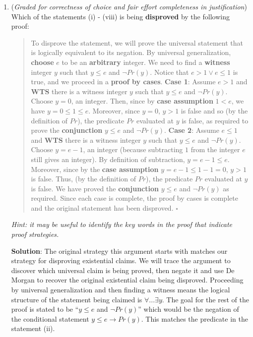 \begin{enumerate}
\begin{enumerate}
   \item ({\it Graded for correctness of choice and fair effort completeness in justification}) 
   Which of the statements (i) - (viii) is being {\bf disproved} by the following proof:
   \begin{quote}
     To disprove the statement, we will prove the universal
     statement that is logically equivalent to its negation. 
     By universal generalization, {\bf choose} $e$ to be an {\bf arbitrary} integer. 
     We need to find a {\bf witness} integer $y$ such that $y \leq e$ and $\lnot Pr(y)$.
     Notice that $e > 1 \lor e \leq 1$ is true, and we proceed in a {\bf proof by cases}.
     {\bf Case 1}: Assume $e > 1$ and {\bf WTS} there is a witness integer $y$ such that
     $y \leq e$ and $\lnot Pr(y)$. Choose $y = 0$, an integer. Then, since by {\bf case assumption}
     $1 < e$, we have $y = 0 \leq 1 \leq e$.
     Moreover, since $y = 0$, $y > 1$ is false and so (by the definition of $Pr$), the predicate $Pr$
     evaluated at $y$ is false, as required to prove the {\bf conjunction} $y \leq e$ and $\lnot Pr(y)$. 
     {\bf Case 2}: 
     Assume $e \leq 1$ and {\bf WTS} there is a witness integer $y$ such that
     $y \leq e$ and $\lnot Pr(y)$. Choose $y = e-1$, an integer (because subtracting
     $1$ from the integer $e$ still gives an integer). By definition of subtraction, $y = e-1 \leq e$.
     Moreover, since by the {\bf case assumption} $y = e-1 \leq 1-1= 0$, $y > 1$ is false. Thus, 
    (by the definition of $Pr$), the predicate $Pr$
     evaluated at $y$ is false. We have proved the {\bf conjunction} $y \leq e$ and $\lnot Pr(y)$ as required.
     Since each case is complete, the proof by cases is complete and the original
     statement has been disproved.  $\square$
   \end{quote}
   
   {\it Hint: it may be useful to 
   identify the key words in the proof that indicate proof strategies.}

   {\bf Solution}: The original strategy this argument starts with matches our strategy
   for disproving existential claims. We will trace the argument to discover which
   universal claim is being proved, then negate it and use De Morgan to recover the original 
   existential claim being disproved. Proceeding by universal generalization and then 
   finding a witness means the logical structure of the statement being claimed is 
   $\forall ... \exists y$. The goal for the rest of the proof is stated to be ``$y \leq e$ and $\lnot Pr(y)$''
   which would be the negation of the conditional statement $y \leq e \to Pr(y)$.
   This matches the predicate in the statement (ii).


\end{enumerate}
\end{enumerate}
